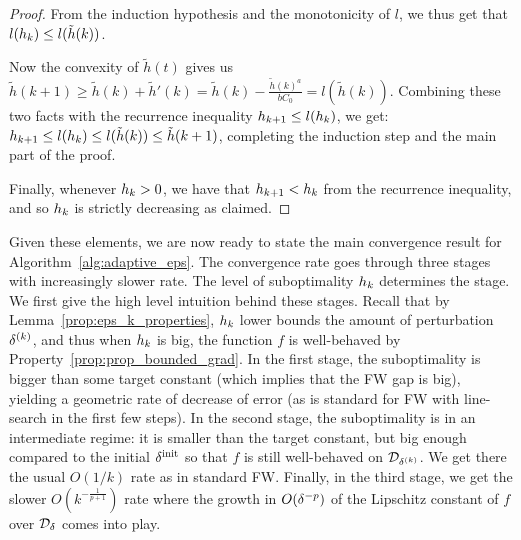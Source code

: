 \begin{proof}
From the induction hypothesis and the monotonicity of $l$, we thus get that $l(h_k)\leq l(\tilde{h}(k))$. 

Now the convexity of $\tilde{h}(t)$ gives us $\tilde{h}(k+1)\geq \tilde{h}(k)+\tilde{h}'(k)=\tilde{h}(k)-\frac{\tilde{h}(k)^a}{b C_0} = l(\tilde{h}(k))$.
Combining these two facts with the recurrence inequality $h_{k+1} \leq l(h_k)$, we get:
$h_{k+1}\leq l(h_k) \leq l(\tilde{h}(k))\leq \tilde{h}(k+1)$, completing the induction step
and the main part of the proof.

Finally, whenever $h_k > 0$, we have that $h_{k+1} < h_k$ from the recurrence inequality, and so 
$h_k$ is strictly decreasing as claimed.
\end{proof}

Given these elements, we are now ready to state the main convergence result for Algorithm~\ref{alg:adaptive_eps}. The convergence rate goes through three stages with increasingly slower rate. The level of suboptimality $h_k$ determines the stage. We first give the high level intuition behind these stages. Recall that by Lemma~\ref{prop:eps_k_properties}, $h_k$ lower bounds the amount of perturbation $\delta^{(k)}$, and thus when $h_k$ is big, the function $f$ is well-behaved by Property~\ref{prop:prop_bounded_grad}. In the first stage, the suboptimality is bigger than some target constant (which implies that the FW gap is big), yielding a geometric rate of decrease of error (as is standard for FW with line-search in the first few steps). In the second stage, the suboptimality is in an intermediate regime: it is smaller than the target constant, but big enough compared to the initial $\delta^{\mathrm{init}}$ so that $f$ is still well-behaved on $\mathcal{D}_{\delta^{(k)}}$. We get there the usual $O(1/k)$ rate as in standard FW. Finally, in the third stage, we get the slower $O(k^{-\frac{1}{p+1}})$ rate where the growth in $O(\delta^{-p})$ of the Lipschitz constant of $f$ over $\mathcal{D}_{\delta}$ comes into play.
